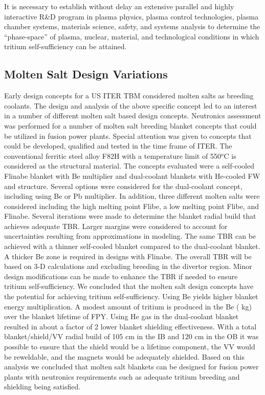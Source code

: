 It is necessary to establish without delay an extensive parallel and highly
interactive R\&D program in plasma physics, plasma control technologies, plasma
chamber systems, materials science, safety, and systems analysis to determine
the “phase-space” of plasma, nuclear, material, and technological conditions
in which tritium self-sufficiency can be attained.


\subsection{Molten Salt Design Variations}

Early design concepts for a US ITER \gls{TBM} considered molten salts as
breeding coolants.  The design and analysis of the above specific concept led
to an interest in a number of different molten salt based design concepts.
Neutronics assessment was performed for a number of molten salt breeding
blanket concepts that could be utilized in fusion power plants. Special
attention was given to concepts that could be developed, qualified and tested
in the time frame of ITER. The conventional ferritic steel alloy F82H with a
temperature limit of 550$^o$C is considered as the structural material. The
concepts evaluated were a self-cooled Flinabe blanket with Be multiplier and
dual-coolant blankets with He-cooled FW and structure.  Several options were
considered for the dual-coolant concept, including using Be or Pb
multiplier. In addition, three different molten salts were considered
including the high melting point Flibe, a low melting point Flibe, and
Flinabe. Several iterations were made to determine the blanket radial build
that achieves adequate \gls{TBR}. Larger margins were considered to account
for uncertainties resulting from approximations in modeling.  The same
\gls{TBR} can be achieved with a thinner self-cooled blanket compared to the
dual-coolant blanket. A thicker Be zone is required in designs with
Flinabe. The overall \gls{TBR} will be  based on 3-D
calculations and excluding breeding in the divertor region. Minor design
modifications can be made to enhance the \gls{TBR} if needed to ensure tritium
self-sufficiency. We concluded that the molten salt design concepts have the
potential for achieving tritium self-sufficiency. Using Be yields higher
blanket energy multiplication. A modest amount of tritium is produced in the
Be ( kg) over the blanket lifetime of  FPY. Using He
gas in the dual-coolant blanket resulted in about a factor of 2 lower blanket
shielding effectiveness. With a total blanket/shield/\gls{VV} radial build of
105 cm in the \gls{IB} and 120 cm in the \gls{OB} it was possible to ensure
that the shield would be a lifetime component, the \gls{VV} would be
reweldable, and the magnets would be adequately shielded. Based on this
analysis we concluded that molten salt blankets can be designed for fusion
power plants with neutronics requirements such as adequate tritium breeding
and shielding being satisfied.

